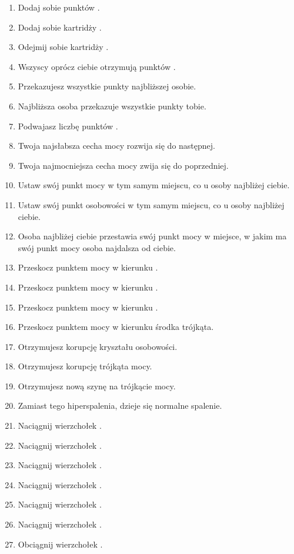 \begin{enumerate}
	\item Dodaj sobie \dxx{} punktów \xpmcn{}.
	\item Dodaj sobie \dvi{} kartridży \abkar{}.
	\item Odejmij sobie \diiii{} kartridży \abkar{}.
	\item Wszyscy oprócz ciebie otrzymują \dvi{} punktów \xpmcn{}.
	\item Przekazujesz wszystkie punkty \xpmcn{} najbliższej osobie.
	\item Najbliższa osoba przekazuje wszystkie punkty \xpmcn{} tobie.
	\item Podwajasz liczbę punktów \xpmcn{}.
	\item Twoja najsłabsza cecha mocy rozwija się do następnej.
	\item Twoja najmocniejsza cecha mocy zwija się do poprzedniej.
	\item Ustaw swój punkt mocy w tym samym miejscu, co u osoby najbliżej ciebie.
	\item Ustaw swój punkt osobowości w tym samym miejscu, co u osoby najbliżej ciebie.
	\item Osoba najbliżej ciebie przestawia swój punkt mocy w miejsce, w jakim ma swój punkt mocy osoba najdalsza od ciebie.
	\item Przeskocz punktem mocy w kierunku \absm{}.
	\item Przeskocz punktem mocy w kierunku \abdm{}.
	\item Przeskocz punktem mocy w kierunku \abrm{}.
	\item Przeskocz punktem mocy w kierunku środka trójkąta.
	\item Otrzymujesz korupcję kryształu osobowości.
	\item Otrzymujesz korupcję trójkąta mocy.
	\item Otrzymujesz nową szynę na trójkącie mocy.
	\item Zamiast tego hiperspalenia, dzieje się normalne spalenie.
	\item Naciągnij wierzchołek \abi{}.
	\item Naciągnij wierzchołek \abs{}.
	\item Naciągnij wierzchołek \abt{}.
	\item Naciągnij wierzchołek \abh{}.
	\item Naciągnij wierzchołek \abp{}.
	\item Naciągnij wierzchołek \aba{}.
	\item Obciągnij wierzchołek \abi{}.

\end{enumerate}
